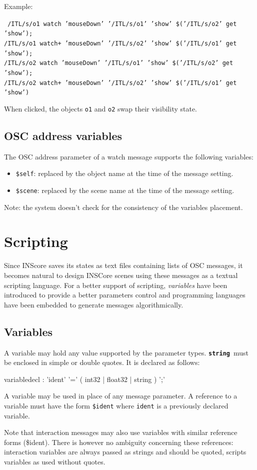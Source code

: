 \documentclass[a4paper,twoside]{report}
\newcommand{\toplevel}[1]	{\chapter{#1}}
\newcommand{\sublevel}[1]	{\section{#1}}
\newcommand{\OSC}[1]		{\texttt{#1}}
\newcommand{\osctype}[1]{\textbf{\texttt{{\small #1}}}}
\newcommand{\oscstring}{\osctype{string}}
\newcommand{\sample}	[1]			{\begin{center}\colorbox{mygrey}{
								\begin{minipage}[t]{0.9\columnwidth} 
								{\small \texttt{#1}}
								\end{minipage}}\end{center}}
\begin{document}
Example:
\sample{ 
/ITL/s/o1 watch  'mouseDown' '/ITL/s/o1' 'show' \$('/ITL/s/o2' get 'show'); \\
/ITL/s/o1 watch+ 'mouseDown' '/ITL/s/o2' 'show' \$('/ITL/s/o1' get 'show'); \\
/ITL/s/o2 watch  'mouseDown' '/ITL/s/o1' 'show' \$('/ITL/s/o2' get 'show'); \\
/ITL/s/o2 watch+ 'mouseDown' '/ITL/s/o2' 'show' \$('/ITL/s/o1' get 'show')
}
When clicked, the objects \OSC{o1} and \OSC{o2} swap their visibility state.



\sublevel{OSC address variables}
\label{oscvar}
The OSC address parameter of a watch message supports the following variables:
\begin{itemize}
\item \OSC{\$self}: replaced by the object name at the time of the message setting.
\item \OSC{\$scene}: replaced by the scene name at the time of the message setting.
\end{itemize}
Note: the system doesn't check for the consistency of the variables placement.

\toplevel{Scripting}\label{scripting}

Since INScore saves its states as text files containing lists of OSC messages, it becomes natural to design INSCore scenes using these messages as a textual scripting language. For a better support of scripting, \emph{variables} have been introduced to provide a better parameters control and programming languages have been embedded to generate messages algorithmically.

\sublevel{Variables}\label{scriptvar}

A variable may hold any value supported by the parameter types. \oscstring\ must be enclosed in simple or double quotes. It is declared as follows:
\begin{rail} 
variabledecl : 'ident' '=' ( int32 | float32 | string ) ';'
\end{rail}
A variable may be used in place of any message parameter. A reference to a variable must have the form \OSC{\$ident} where \OSC{ident} is a previously declared variable. 

Note that interaction messages may also use variables with similar reference forms (\$ident). There is however no ambiguity concerning these references: interaction variables are always passed as strings and should be quoted, scripts variables as used without quotes.
\end{document}
